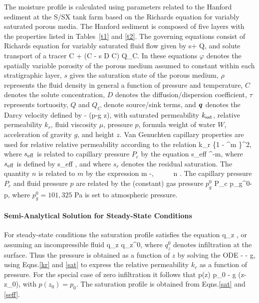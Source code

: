 \documentclass[12pt]{article}
\begin{document}
The moisture profile is calculated using parameters related to the Hanford sediment at the S/SX tank farm based on the Richards equation for variably saturated porous media. The Hanford sediment is composed of five layers with the properties listed in Tables~\ref{t1} and \ref{t2}. The governing equations consist of Richards equation for variably saturated fluid flow given by
\EQ
{} \varphi s\rho + \bnabla\cdot\bq\rho \eq Q,
\EN
and solute transport of a tracer
\EQ
{}\varphi C + \bnabla\cdot\big(\bq C - \varphi s \tau D \bnabla C\big) \eq Q_C.
\EN
In these equations $\varphi$ denotes the spatially variable porosity of the porous medium assumed to constant within each stratigraphic layer, $s$ gives the saturation state of the porous medium, $\rho$ represents the fluid density in general a function of pressure and temperature, $C$ denotes the solute concentration, $D$ denotes the diffusion/dispersion coefficient, $\tau$ represents tortuosity, $Q$ and $Q_C$ denote source/sink terms, and $\boldsymbol{q}$ denotes the Darcy velocity defined by
\EQ
\bq\eq -  \bnabla (p-\rho g z),
\EN
with saturated permeability $k_{\rm sat}$, relative permeability $k_r$, fluid viscosity $\mu$, pressure $p$, formula weight of water $W$, acceleration of gravity $g$, and height $z$. Van Genuchten capillary properties are used for relative relative permeability according to the relation
\EQ\label{kr}
k_{r} \eq {} \left\{1 - ^m \right\}^2, 
\EN
where $s_{\rm eff}$ is related to capillary pressure $P_c$ by the equation
\EQ\label{sat}
s_{\rm eff} \eq {}^{-m}, 
\EN 
where $s_{\rm 
eff}$ is defined by 
\EQ\label{seff1}
s_{\rm eff} \eq {}, 
\EN 
and where $s_r$ denotes the residual saturation. The quantity $n$ is related to $m$ by the expression 
\EQ\label{lambda} 
m -, \ \ \ \ \ n \eq {}. 
\EN 
The capillary pressure $P_c$ and fluid pressure $p$ are related by the (constant) gas pressure $p_g^0$
\EQ
P_c \eq p_g^0-p,
\EN
where $p_g^0 \!=\! 101,325$ Pa is set to atmospheric pressure.

\paragraph{Semi-Analytical Solution for Steady-State Conditions}

For steady-state conditions the saturation profile satisfies the equation
\EQ
{} \rho q_z ,
\EN
or assuming an incompressible fluid
\EQ
q_z \eq q_z^0,
\EN
where $q_z^0$ denotes infiltration at the surface. Thus the pressure is obtained as a function of $z$ by solving the ODE
\EQ\label{dpdz}
 \eq - - \rho g,
\EN
using Eqns.\eqref{kr} and \eqref{sat} to express the relative permeability $k_r$ as a function of pressure. For the special case of zero infiltration it follows that
\EQ
p(z) \eq p_0 - \rho g (z-z_0),
\EN
with $p(z_0)\!=\!p_0$. The saturation profile is obtained from Eqns.\eqref{sat} and \eqref{seff}.
\end{document}
